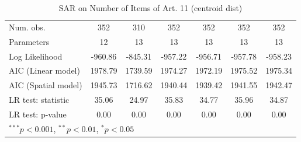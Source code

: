 \begin{table}[!h]
\begin{center}
\begin{tabular}{l c c c c c c }
\midrule
Num. obs.               & 352          & 310          & 352          & 352          & 352          & 352          \\
Parameters              & 12           & 13           & 13           & 13           & 13           & 13           \\
Log Likelihood          & -960.86      & -845.31      & -957.22      & -956.71      & -957.78      & -958.23      \\
AIC (Linear model)      & 1978.79      & 1739.59      & 1974.27      & 1972.19      & 1975.52      & 1975.34      \\
AIC (Spatial model)     & 1945.73      & 1716.62      & 1940.44      & 1939.42      & 1941.55      & 1942.47      \\
LR test: statistic      & 35.06        & 24.97        & 35.83        & 34.77        & 35.96        & 34.87        \\
LR test: p-value        & 0.00         & 0.00         & 0.00         & 0.00         & 0.00         & 0.00         \\
\bottomrule
\multicolumn{7}{l}{\scriptsize{$^{***}p<0.001$, $^{**}p<0.01$, $^*p<0.05$}}
\end{tabular}
\caption{SAR on Number of Items of Art. 11 (centroid dist)}
\label{table:coefficients}
\end{center}
\end{table}
